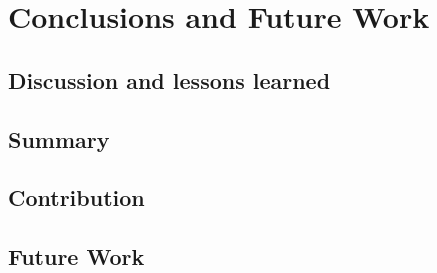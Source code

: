 \chapter{Conclusions and Future Work}

\section{Discussion and lessons learned}

\section{Summary}

\section{Contribution}

\section{Future Work}
